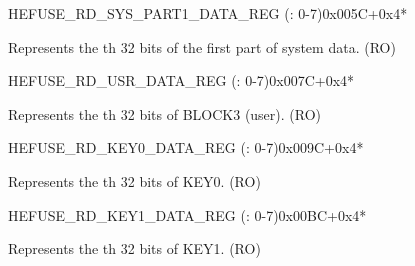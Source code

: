 \begin{register}{H}{EFUSE\_RD\_SYS\_PART1\_DATA\_REG (: 0-7)}{0x005C+0x4*}\label{regdesc:EFUSERDSYSPART1DATANREG}
%
\regnewline%
\begin{regdesc}\begin{reglist}
\label{fielddesc:EFUSESYSDATAPART1N}\item [EFUSE\_SYS\_DATA\_PART1\_\regindex{n}] Represents the th 32 bits of the first part of system data. (RO)
\end{reglist}\end{regdesc}
\end{register}


\begin{register}{H}{EFUSE\_RD\_USR\_DATA\_REG (: 0-7)}{0x007C+0x4*}\label{regdesc:EFUSERDUSRDATAMREG}
%
\regnewline%
\begin{regdesc}\begin{reglist}
\label{fielddesc:EFUSEUSRDATAM}\item [EFUSE\_USR\_DATA\regindex{m}] Represents the th 32 bits of BLOCK3 (user). (RO)
\end{reglist}\end{regdesc}
\end{register}


\begin{register}{H}{EFUSE\_RD\_KEY0\_DATA\_REG (: 0-7)}{0x009C+0x4*}\label{regdesc:EFUSERDKEY0DATANREG}
%
\regnewline%
\begin{regdesc}\begin{reglist}
\label{fielddesc:EFUSEKEY0DATAN}\item [EFUSE\_KEY0\_DATA\regindex{n}] Represents the th 32 bits of KEY0. (RO)
\end{reglist}\end{regdesc}
\end{register}


\begin{register}{H}{EFUSE\_RD\_KEY1\_DATA\_REG (: 0-7)}{0x00BC+0x4*}\label{regdesc:EFUSERDKEY1DATAMREG}
%
\regnewline%
\begin{regdesc}\begin{reglist}
\label{fielddesc:EFUSEKEY1DATAM}\item [EFUSE\_KEY1\_DATA\regindex{m}] Represents the th 32 bits of KEY1. (RO)
\end{reglist}\end{regdesc}
\end{register}


